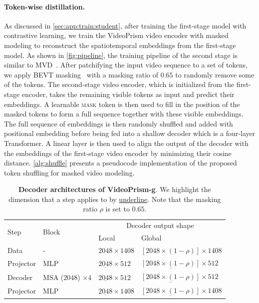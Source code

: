 \documentclass{article}
\theoremstyle{plain}
\theoremstyle{definition}
\theoremstyle{remark}
\newcommand{\OURS}{VideoPrism\xspace}
\begin{document}
\paragraph{Token-wise distillation.} As discussed in \cref{sec:app:train:student}, after training the first-stage model with contrastive learning, we train the \OURS video encoder with masked modeling to reconstruct the spatiotemporal embeddings from the first-stage model.
As shown in \cref{fig:pipeline}, the training pipeline of the second stage is similar to MVD~\cite{wang2023masked}.
After patchifying the input video sequence to a set of tokens, we apply BEVT masking~\cite{wang2022bevt} with a masking ratio of $0.65$ to randomly remove some of the tokens.
The second-stage video encoder, which is initialized from the first-stage encoder, takes the remaining visible tokens as input and predict their embeddings.
A learnable \textsc{mask} token is then used to fill in the position of the masked tokens to form a full sequence together with these visible embeddings.
The full sequence of embeddings is then randomly shuffled and added with positional embedding before being fed into a shallow decoder which is a four-layer Transformer.
A linear layer is then used to align the output of the  decoder with the embeddings of the first-stage video encoder by minimizing their cosine distance.
\cref{alg:shuffle} presents a pseudocode implementation of the proposed token shuffling for masked video modeling.


\begin{table}[t]
    \caption{\textbf{Decoder architectures of \OURS-g}. We highlight the dimension that a step applies to by \underline{underline}. Note that the masking ratio $\rho$ is set to $0.65$.}
	\label{tab:arch_decoder}
\begin{center}
\begin{scriptsize}
    \begin{tabular}	{@{}l|lll@{}}
        \toprule
        \multirow{2}{*}{Step} & \multirow{2}{*}{Block} & \multicolumn{2}{c}{Decoder output shape} \\
        & & Local & Global \\
        \midrule
        Data & - & $ 2048 \times 1408 $ & $[2048\times(1-\rho)] \times 1408$ \\
        Projector & MLP & $ \underline{2048} \times 512 $ & $\underline{[2048\times(1-\rho)]} \times 512 $ \\
        Decoder & MSA ($2048$) $\times 4$ & $\underline{2048} \times 512 $ & $\underline{[2048\times(1-\rho)]} \times 512 $  \\
        Projector & MLP & $\underline{2048} \times 1408$ & $\underline{[2048\times(1-\rho)]} \times 1408$ \\
    	\bottomrule
		\end{tabular}
	\end{scriptsize}
\end{center}
	\vskip -0.1in
\end{table}
\end{document}

